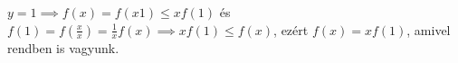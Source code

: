$y=1 \implies f(x)=f(x1)\le xf(1)$ és $f(1)=f(\frac{x}{x})=\frac{1}{x}f(x) \implies xf(1)\le f(x)$, 
ezért $f(x)=xf(1)$, amivel rendben is vagyunk.
